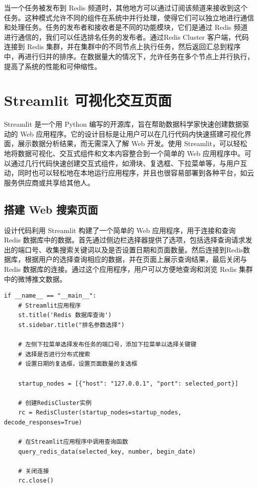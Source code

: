 \documentclass[12pt,hyperref,a4paper,UTF8]{ctexart}
\begin{document}
当一个任务被发布到 Redis 频道时，其他地方可以通过订阅该频道来接收到这个任务。这种模式允许不同的组件在系统中并行处理，使得它们可以独立地进行通信和处理任务。任务的发布者和接收者是不同的功能模块，它们是通过 Redis 频道进行通信的，我们可以任选排名任务的发布者。通过Redis Cluster 客户端，代码连接到 Redis 集群，并在集群中的不同节点上执行任务，然后返回汇总到程序中，再进行归并的排序。在数据量大的情况下，允许任务在多个节点上并行执行，提高了系统的性能和可伸缩性。

\newpage
\section{Streamlit 可视化交互页面}

Streamlit 是一个用 Python 编写的开源库，旨在帮助数据科学家快速创建数据驱动的 Web 应用程序。它的设计目标是让用户可以在几行代码内快速搭建可视化界面，展示数据分析结果，而无需深入了解 Web 开发。使用 Streamlit，可以轻松地将数据可视化、交互式组件和文本内容整合到一个简单的 Web 应用程序中。可以通过几行代码快速创建交互式组件，如滑块、复选框、下拉菜单等，与用户互动，同时也可以轻松地在本地运行应用程序，并且也很容易部署到各种平台，如云服务供应商或共享给其他人。

\subsection{搭建 Web 搜索页面}

设计代码利用 Streamlit 构建了一个简单的 Web 应用程序，用于连接和查询 Redis 数据库中的数据。首先通过侧边栏选择器提供了选项，包括选择查询请求发出的端口号、收集搜索关键词以及是否设置日期和页面数量。然后连接到Redis数据库，根据用户的选择查询相应的数据，并在页面上展示查询结果，最后关闭与 Redis 数据库的连接。通过这个应用程序，用户可以方便地查询和浏览 Redis 集群中的微博推文数据。

\begin{verbatim} 
if __name__ == "__main__":
    # Streamlit应用程序
    st.title('Redis 数据库查询')
    st.sidebar.title("排名参数选择")

    # 左侧下拉菜单选择发布任务的端口号，添加下拉菜单以选择关键键
    # 选择是否进行分布式搜索
    # 设置日期的复选框，设置页面数量的复选框
    
    startup_nodes = [{"host": "127.0.0.1", "port": selected_port}]

    # 创建RedisCluster实例
    rc = RedisCluster(startup_nodes=startup_nodes, decode_responses=True)

    # 在Streamlit应用程序中调用查询函数
    query_redis_data(selected_key, number, begin_date)
    
    # 关闭连接
    rc.close()
\end{verbatim} 
\end{document}
